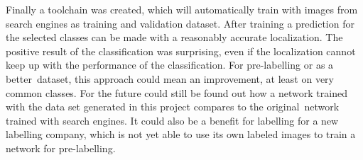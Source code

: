 \documentclass[../ImageClassifier.tex]{subfiles}
\begin{document}
    Finally a toolchain was created, which will automatically train with images from search engines as training and validation dataset.
    After training a prediction for the selected classes can be made with a reasonably accurate localization.
    The positive result of the classification was surprising, even if the localization cannot keep up with the performance of the classification.
    For pre-labelling or as a \glqq better\grqq\ dataset, this approach could mean an improvement, at least on very common classes.
    For the future could still be found out how a network trained with the data set generated in this project compares to the \glqq original\grqq\ network trained with search engines.
    It could also be a benefit for labelling for a new labelling company, which is not yet able to use its own labeled images to train a network for pre-labelling.
\end{document}
